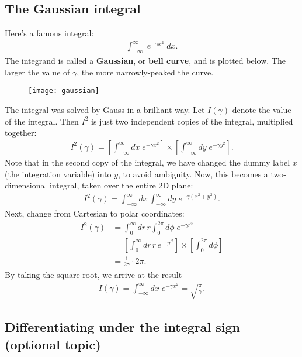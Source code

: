 \documentclass[10pt,a4paper]{article}
\begin{document}
\subsection{The Gaussian integral}
\label{the-gaussian-integral}

Here's a famous integral:
\begin{align}
  \int_{-\infty}^\infty \; e^{-\gamma x^2} \; dx.
\end{align}
The integrand is called a \textbf{Gaussian}, or \textbf{bell curve},
and is plotted below. The larger the value of $\gamma$, the more
narrowly-peaked the curve.

\begin{figure}[h]
  \centering\texttt{[image: gaussian]}
\end{figure}

The integral was solved by
\href{http://en.wikipedia.org/wiki/Carl_Friedrich_Gauss}{Gauss} in a
brilliant way.  Let $I(\gamma)$ denote the value of the integral.
Then $I^2$ is just two independent copies of the integral, multiplied
together:
\begin{align}
  I^2(\gamma) = \left[\int_{-\infty}^\infty dx\; e^{-\gamma x^2}\right] \times \left[\int_{-\infty}^\infty dy\; e^{-\gamma y^2}\right].
\end{align}
Note that in the second copy of the integral, we have changed the
dummy label $x$ (the integration variable) into $y$, to avoid
ambiguity.  Now, this becomes a two-dimensional integral, taken over
the entire 2D plane:
\begin{align}
  I^2(\gamma) = \int_{-\infty}^\infty dx\, \int_{-\infty}^\infty dy \; e^{-\gamma (x^2+y^2)}.
\end{align}
Next, change from Cartesian to polar coordinates:
\begin{align}
  I^2(\gamma) &= \int_{0}^\infty dr\, r \int_{0}^{2\pi} d\phi \; e^{-\gamma r^2} \\
  &= \left[ \int_{0}^\infty dr\, r \, e^{-\gamma r^2}\right] \times \left[\int_{0}^{2\pi} d\phi \right] \\&
  = \frac{1}{2\gamma} \cdot 2\pi.
\end{align}
By taking the square root, we arrive at the result
\begin{align}
  I(\gamma) = \int_{-\infty}^\infty dx \; e^{-\gamma x^2} = \sqrt{\frac{\pi}{\gamma}}.
\end{align}

\subsection{Differentiating under the integral sign (optional topic)}
\label{differentiating-under-the-integral-sign}
\end{document}
